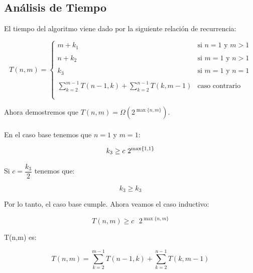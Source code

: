 \documentclass[12pt,a4,paper]{article}
\begin{document}
\subsection*{Análisis de Tiempo}

El tiempo del algoritmo viene dado por la siguiente relación de recurrencia:

\begin{equation*}
    T(n, m) =
    \begin{cases}
        m + k_1 & \text{si } n = 1 \text{ y } m > 1\\\\
        n + k_2 & \text{si } m = 1 \text{ y } n > 1\\\\
        k_3 & \text{si } m = 1 \text{ y } n = 1\\\\
        \sum_{k = 2}^{m-1} {T(n-1, k)} + \sum_{k = 2}^{n-1} {T(k, m-1)} & \text{caso contrario}\\\\
    \end{cases}
\end{equation*}

Ahora demostremos que $T(n,m) = \Omega(2^{\max\{n,m\}}).$\\\\

En el caso base tenemos que $n = 1$ y $m = 1$:

\begin{equation*}
    k_3 \geq c\text{ }2^{\max\{1,1\}}\\\\
\end{equation*}

Si $c = \dfrac{k_3}{2}$ tenemos que:

\begin{equation*}
    k_3 \geq k_3
\end{equation*}

Por lo tanto, el caso base cumple. Ahora veamos el caso inductivo:

\begin{equation*}
    T(n,m) \geq c\text{ }2^{\max\{n,m\}}
\end{equation*}

T(n,m) es:

\begin{equation*}
    T(n,m) = \sum_{k = 2}^{m-1} {T(n-1, k)} + \sum_{k = 2}^{n-1} {T(k, m-1)}
\end{equation*}
\end{document}
